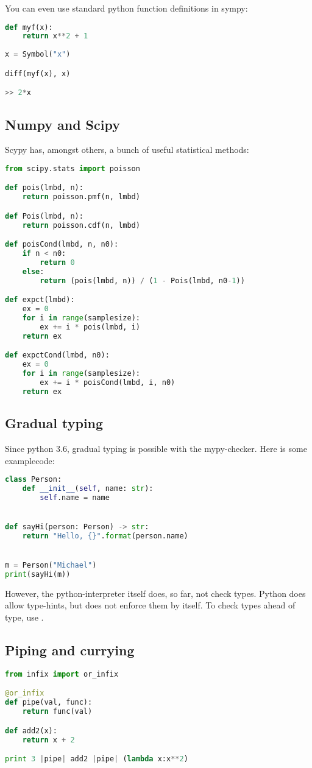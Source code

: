 You can even use standard python function  definitions in sympy:

\begin{lstlisting}[language=python]
def myf(x):
    return x**2 + 1
    
x = Symbol("x")

diff(myf(x), x)

>> 2*x
\end{lstlisting}

\subsection{Numpy and Scipy}
Scypy has, amongst others, a bunch of useful statistical methods: 
\begin{lstlisting}[language=python]
from scipy.stats import poisson

def pois(lmbd, n):
    return poisson.pmf(n, lmbd)

def Pois(lmbd, n):
    return poisson.cdf(n, lmbd)

def poisCond(lmbd, n, n0):
    if n < n0:
        return 0
    else:
        return (pois(lmbd, n)) / (1 - Pois(lmbd, n0-1))

def expct(lmbd):
    ex = 0
    for i in range(samplesize):
        ex += i * pois(lmbd, i)
    return ex

def expctCond(lmbd, n0):
    ex = 0
    for i in range(samplesize):
        ex += i * poisCond(lmbd, i, n0)
    return ex
\end{lstlisting}


\subsection{Gradual typing}
Since python 3.6, gradual typing is possible with the mypy-checker. 
Here is some examplecode:
\begin{lstlisting}[language=python]
class Person:
    def __init__(self, name: str):
        self.name = name


def sayHi(person: Person) -> str:
    return "Hello, {}".format(person.name)


m = Person("Michael")
print(sayHi(m))
\end{lstlisting}

However, the python-interpreter itself does, so far, not check types. Python does allow type-hints, but does not enforce them by itself. To check types ahead of type, use .

\subsection{Piping and currying}
\begin{lstlisting}[language=python]
from infix import or_infix

@or_infix
def pipe(val, func):
    return func(val)

def add2(x):
    return x + 2

print 3 |pipe| add2 |pipe| (lambda x:x**2)
\end{lstlisting}


